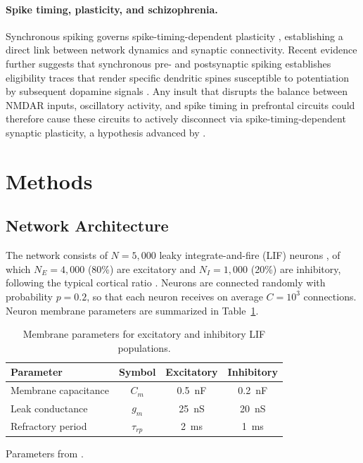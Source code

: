 \documentclass[10pt]{article}
\begin{document}
\paragraph{Spike timing, plasticity, and schizophrenia.}
Synchronous spiking governs spike-timing-dependent plasticity
\citep{dan2004spike}, establishing a direct link between network dynamics
and synaptic connectivity. Recent evidence further suggests that synchronous
pre- and postsynaptic spiking establishes eligibility traces that render
specific dendritic spines susceptible to potentiation by subsequent dopamine
signals \citep{he2015eligibility, yagishita2014critical}. Any insult that
disrupts the balance between NMDAR inputs, oscillatory activity, and spike
timing in prefrontal circuits could therefore cause these circuits to
actively disconnect via spike-timing-dependent synaptic plasticity, a
hypothesis advanced by \citet{zick2018blocking, zick2021disparate}.

\section{Methods}

\subsection{Network Architecture}

The network consists of $N = 5{,}000$ leaky integrate-and-fire (LIF) neurons
\citep{dayan2001theoretical}, of which $N_E = 4{,}000$ (80\%) are excitatory
and $N_I = 1{,}000$ (20\%) are inhibitory, following the typical cortical ratio
\citep{abeles1991corticonics}. Neurons are connected randomly with probability
$p = 0.2$, so that each neuron receives on average $C = 10^3$ connections.
Neuron membrane parameters are summarized in Table~\ref{tab:neuron_params}.

\begin{table}[htbp]
\centering
\caption{Membrane parameters for excitatory and inhibitory LIF populations.}
\label{tab:neuron_params}
\begin{tabular}{lccc}
\toprule
Parameter & Symbol & Excitatory & Inhibitory \\
\midrule
Membrane capacitance & $C_m$ & 0.5~nF & 0.2~nF \\
Leak conductance & $g_m$ & 25~nS & 20~nS \\
Refractory period & $\tau_{rp}$ & 2~ms & 1~ms \\
\bottomrule
\end{tabular}
\begin{flushleft}
\footnotesize{Parameters from \citet{koch2004biophysics}.}
\end{flushleft}
\end{table}
\end{document}
